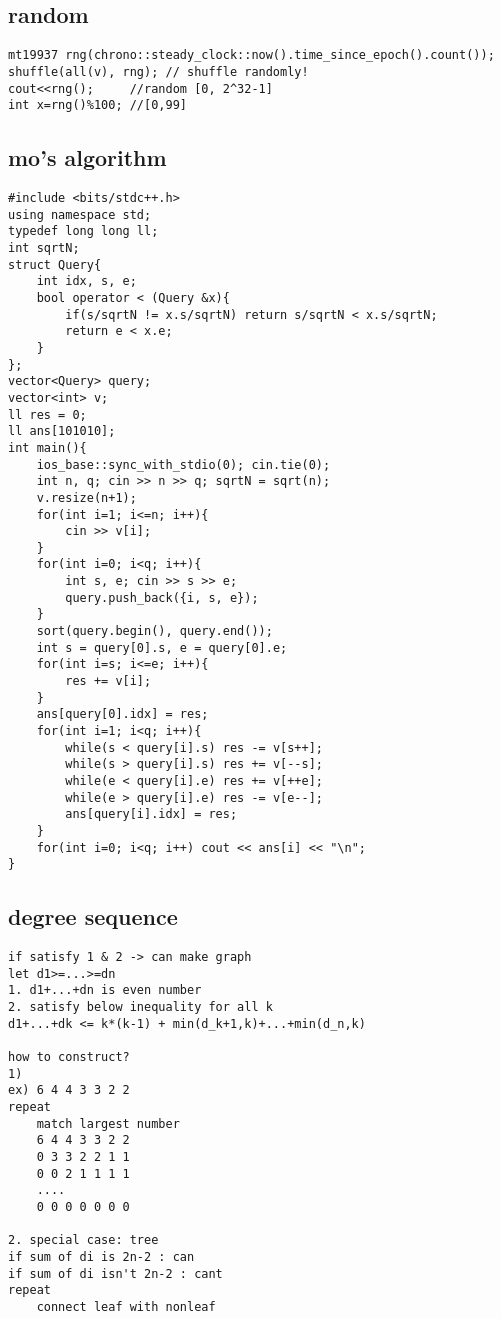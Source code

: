 \documentclass[landscape, 8pt, a4paper, oneside, twocolumn]{extarticle}
\begin{document}
\subsection{random}
\begin{verbatim}
mt19937 rng(chrono::steady_clock::now().time_since_epoch().count());
shuffle(all(v), rng); // shuffle randomly!
cout<<rng();     //random [0, 2^32-1]
int x=rng()%100; //[0,99]
\end{verbatim}
\newpage
\subsection{mo's algorithm}
\begin{verbatim}
#include <bits/stdc++.h>
using namespace std;
typedef long long ll;
int sqrtN;
struct Query{
	int idx, s, e;
	bool operator < (Query &x){
		if(s/sqrtN != x.s/sqrtN) return s/sqrtN < x.s/sqrtN;
		return e < x.e;
	}
};
vector<Query> query;
vector<int> v;
ll res = 0;
ll ans[101010];
int main(){
	ios_base::sync_with_stdio(0); cin.tie(0);
	int n, q; cin >> n >> q; sqrtN = sqrt(n);
	v.resize(n+1);
	for(int i=1; i<=n; i++){
		cin >> v[i];
	}
	for(int i=0; i<q; i++){
		int s, e; cin >> s >> e;
		query.push_back({i, s, e});
	}
	sort(query.begin(), query.end());
	int s = query[0].s, e = query[0].e;
	for(int i=s; i<=e; i++){
		res += v[i];
	}
	ans[query[0].idx] = res;
	for(int i=1; i<q; i++){
		while(s < query[i].s) res -= v[s++];
		while(s > query[i].s) res += v[--s];
		while(e < query[i].e) res += v[++e];
		while(e > query[i].e) res -= v[e--];
		ans[query[i].idx] = res;
	}
	for(int i=0; i<q; i++) cout << ans[i] << "\n";
}
\end{verbatim}
\newpage
\subsection{degree sequence}
\begin{verbatim}
if satisfy 1 & 2 -> can make graph
let d1>=...>=dn
1. d1+...+dn is even number
2. satisfy below inequality for all k
d1+...+dk <= k*(k-1) + min(d_k+1,k)+...+min(d_n,k)

how to construct?
1) 
ex) 6 4 4 3 3 2 2
repeat
    match largest number
    6 4 4 3 3 2 2
    0 3 3 2 2 1 1
    0 0 2 1 1 1 1
    ....
    0 0 0 0 0 0 0

2. special case: tree
if sum of di is 2n-2 : can
if sum of di isn't 2n-2 : cant
repeat
    connect leaf with nonleaf
\end{verbatim}
\newpage
\end{document}
